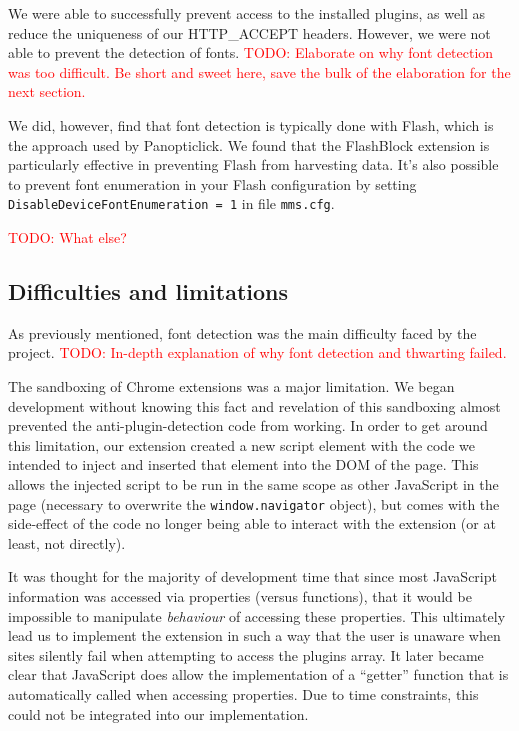 \documentclass[12pt,a4paper]{article}
\begin{document}
We were able to successfully prevent access to the installed plugins, as well as reduce the uniqueness of our HTTP\_ACCEPT headers. However, we were not able to prevent the detection of fonts. \textcolor{red}{TODO: Elaborate on why font detection was too difficult. Be short and sweet here, save the bulk of the elaboration for the next section.}

We did, however, find that font detection is typically done with Flash, which is the approach used by Panopticlick. We found that the FlashBlock extension\cite{flashblock} is particularly effective in preventing Flash from harvesting data. It's also possible to prevent font enumeration in your Flash configuration by setting \texttt{DisableDeviceFontEnumeration = 1} in file \texttt{mms.cfg}.

\textcolor{red}{TODO: What else?}

\subsection{Difficulties and limitations}
As previously mentioned, font detection was the main difficulty faced by the project. \textcolor{red}{TODO: In-depth explanation of why font detection and thwarting failed.}

The sandboxing of Chrome extensions was a major limitation. We began development without knowing this fact and revelation of this sandboxing almost prevented the anti-plugin-detection code from working. In order to get around this limitation, our extension created a new script element with the code we intended to inject and inserted that element into the DOM of the page. This allows the injected script to be run in the same scope as other JavaScript in the page (necessary to overwrite the \texttt{window.navigator} object), but comes with the side-effect of the code no longer being able to interact with the extension (or at least, not directly).

It was thought for the majority of development time that since most JavaScript information was accessed via properties (versus functions), that it would be impossible to manipulate \textit{behaviour} of accessing these properties. This ultimately lead us to implement the extension in such a way that the user is unaware when sites silently fail when attempting to access the plugins array. It later became clear that JavaScript does allow the implementation of a ``getter'' function that is automatically called when accessing properties. Due to time constraints, this could not be integrated into our implementation.
\end{document}
